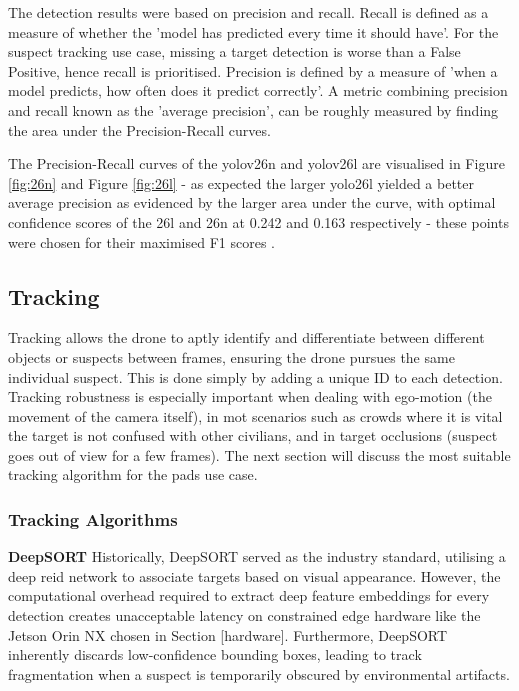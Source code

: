 \documentclass{report_template_oxford}
\begin{document}
The detection results were based on precision and recall. Recall is defined as a measure of whether the 'model has predicted every time it should have'. For the suspect tracking use case, missing a target detection is worse than a False Positive, hence recall is prioritised. Precision is defined by a measure of 'when a model predicts, how often does it predict correctly'. A metric combining precision and recall known as the  'average precision', can be roughly measured by finding the area under the Precision-Recall curves. 

The Precision-Recall curves of the \gls{yolo}v26n and \gls{yolo}v26l are visualised in Figure \ref{fig:26n} and Figure \ref{fig:26l} - as expected the larger \gls{yolo}26l yielded a better average precision as evidenced by the larger area under the curve, with optimal confidence scores of the 26l and 26n at 0.242 and 0.163 respectively - these points were chosen for their maximised  F1 scores \cite{v7labs_map}. 

\subsection{Tracking} \label{tracking}
Tracking allows the drone to aptly identify and differentiate between different objects or suspects between frames, ensuring the drone pursues the same individual suspect. This is done simply by adding a unique ID to each detection. Tracking robustness is especially important when dealing with ego-motion (the movement of the camera itself), in \gls{mot} scenarios such as crowds where it is vital the target is not confused with other civilians, and in target occlusions (suspect goes out of view for a few frames). The next section will discuss the most suitable tracking algorithm for the \gls{pads} use case. 

\subsubsection{Tracking Algorithms}
\textbf{DeepSORT} \quad Historically, DeepSORT \cite{wojke2017simple} served as the industry standard, utilising a deep \gls{reid} network to associate targets based on visual appearance. However, the computational overhead required to extract deep feature embeddings for every detection creates unacceptable latency on constrained edge hardware like the Jetson Orin NX chosen in Section [hardware]. Furthermore, DeepSORT inherently discards low-confidence bounding boxes, leading to track fragmentation when a suspect is temporarily obscured by environmental artifacts.
\end{document}
